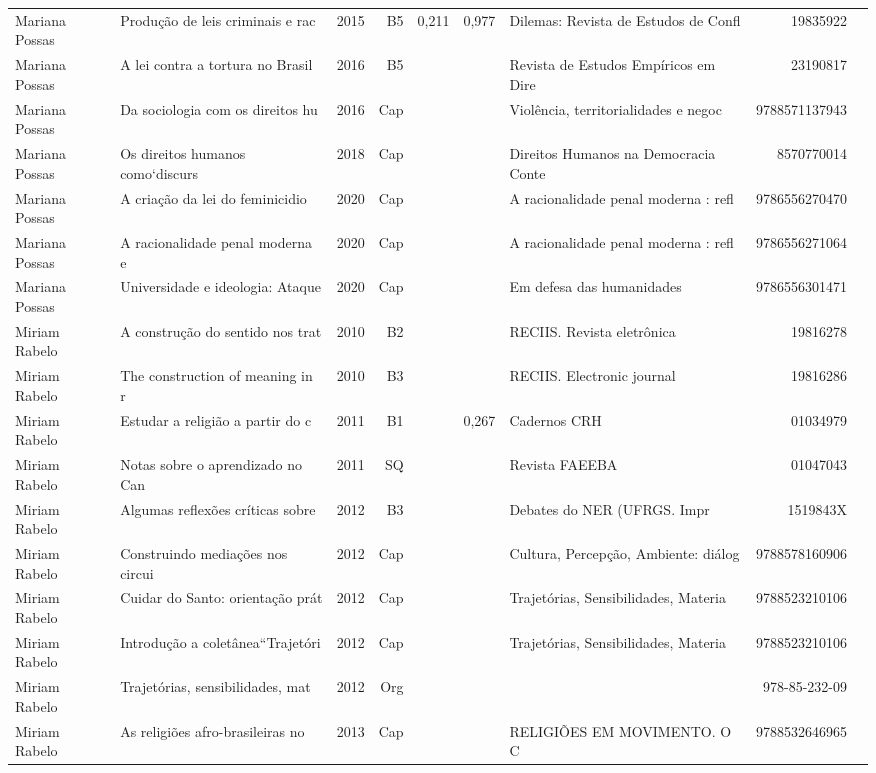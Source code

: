 \documentclass[12pt,brazil]{article}\usepackage[]{graphicx}\usepackage[]{xcolor}
\begin{document}
\begin{longtable}{lllrrllrr}
Mariana Possas & Produção de leis criminais e rac & 2015 & B5 & 0,211 & 0,977 & Dilemas: Revista de Estudos de Confl & 19835922 \\
Mariana Possas & A lei contra a tortura no Brasil & 2016 & B5 &  &  & Revista de Estudos Empíricos em Dire & 23190817 \\
Mariana Possas & Da sociologia com os direitos hu & 2016 & Cap &  &  & Violência, territorialidades e negoc & 9788571137943 \\
Mariana Possas & Os direitos humanos como‘discurs & 2018 & Cap &  &  & Direitos Humanos na Democracia Conte & 8570770014 \\
Mariana Possas & A criação da lei do feminicidio  & 2020 & Cap &  &  & A racionalidade penal moderna : refl & 9786556270470 \\
Mariana Possas & A racionalidade penal moderna e  & 2020 & Cap &  &  & A racionalidade penal moderna : refl & 9786556271064 \\
\rowcolor{coautr}Mariana Possas & Universidade e ideologia: Ataque & 2020 & Cap &  &  & Em defesa das humanidades & 9786556301471 \\
Miriam Rabelo & A construção do sentido nos trat & 2010 & B2 &  &  & RECIIS. Revista eletrônica  & 19816278 \\
Miriam Rabelo & The construction of meaning in r & 2010 & B3 &  &  & RECIIS. Electronic journal  & 19816286 \\
Miriam Rabelo & Estudar a religião a partir do c & 2011 & B1 &  & 0,267 & Cadernos CRH & 01034979 \\
Miriam Rabelo & Notas sobre o aprendizado no Can & 2011 & SQ &  &  & Revista FAEEBA & 01047043 \\
Miriam Rabelo & Algumas reflexões críticas sobre & 2012 & B3 &  &  & Debates do NER (UFRGS. Impr & 1519843X \\
Miriam Rabelo & Construindo mediações nos circui & 2012 & Cap &  &  & Cultura, Percepção, Ambiente: diálog & 9788578160906 \\
Miriam Rabelo & Cuidar do Santo: orientação prát & 2012 & Cap &  &  & Trajetórias, Sensibilidades, Materia & 9788523210106 \\
\rowcolor{coautr}Miriam Rabelo & Introdução a coletânea“Trajetóri & 2012 & Cap &  &  & Trajetórias, Sensibilidades, Materia & 9788523210106 \\
\rowcolor{ninval}Miriam Rabelo & Trajetórias, sensibilidades, mat & 2012 & Org &  &  &  & 978-85-232-09 \\
Miriam Rabelo & As religiões afro-brasileiras no & 2013 & Cap &  &  & RELIGIÕES EM MOVIMENTO. O C & 9788532646965 \\

\end{longtable}
\end{document}
